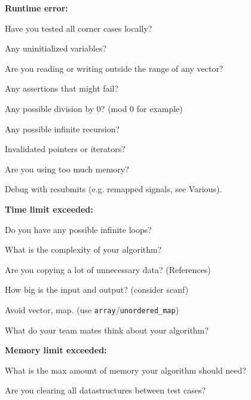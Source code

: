 \textbf{Runtime error:}
\begin{myitemize}
	\item Have you tested all corner cases locally?
	\item Any uninitialized variables?
	\item Are you reading or writing outside the range of any vector?
	\item Any assertions that might fail?
	\item Any possible division by $0$? (mod 0 for example)
	\item Any possible infinite recursion?
	\item Invalidated pointers or iterators?
	\item Are you using too much memory?
	\item Debug with resubmits (e.g. remapped signals, see Various).
\end{myitemize}

\textbf{Time limit exceeded:}
\begin{myitemize}
	\item Do you have any possible infinite loops?
	\item What is the complexity of your algorithm?
	\item Are you copying a lot of unnecessary data? (References)
	\item How big is the input and output? (consider scanf)
	\item Avoid vector, map. (use \texttt{array}/\texttt{unordered\_map})
	\item What do your team mates think about your algorithm?
\end{myitemize}

\textbf{Memory limit exceeded:}
\begin{myitemize}
	\item What is the max amount of memory your algorithm should need?
	\item Are you clearing all datastructures between test cases?
\end{myitemize}
